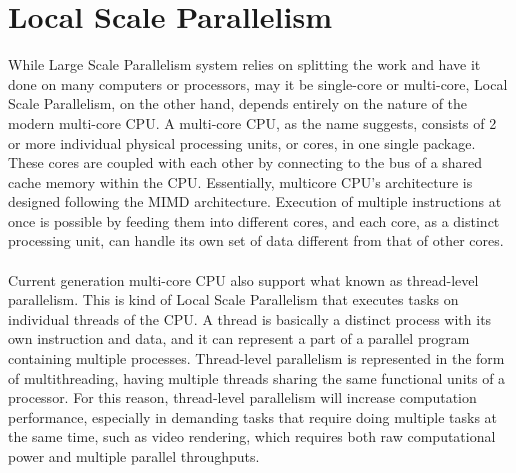 \section{Local Scale Parallelism}

While Large Scale Parallelism system relies on splitting the work and have it done on many computers or processors, may it be single-core or multi-core, Local Scale Parallelism, on the other hand, depends entirely on the nature of the modern multi-core CPU. A multi-core CPU, as the name suggests, consists of 2 or more individual physical processing units, or cores, in one single package. These cores are coupled with each other by connecting to the bus of a shared cache memory within the CPU. Essentially, multicore CPU's architecture is designed following the MIMD architecture. Execution of multiple instructions at once is possible by feeding them into different cores, and each core, as a distinct processing unit, can handle its own set of data different from that of other cores. \\
~\\
Current generation multi-core CPU also support what known as thread-level parallelism. This is kind of Local Scale Parallelism that executes tasks on individual threads of the CPU. A thread is basically a distinct process with its own instruction and data, and it can represent a part of a parallel program containing multiple processes. Thread-level parallelism is represented in the form of multithreading, having multiple threads sharing the same functional units of a processor. For this reason, thread-level parallelism will increase computation performance, especially in demanding tasks that require doing multiple tasks at the same time, such as video rendering, which requires both raw computational power and multiple parallel throughputs. \\
